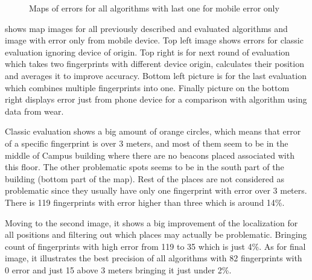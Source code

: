 \begin{figure}[h!]
\begin{centering}
		\par\end{centering}
	\caption{Maps of errors for all algorithms with last one for mobile error only}
	\label{fig09c06}
\end{figure}

 shows map images for all previously described and evaluated algorithms and image with error only from mobile device. Top left image shows errors for classic evaluation ignoring device of origin. Top right is for next round of evaluation which takes two fingerprints with different device origin, calculates their position and averages it to improve accuracy. Bottom left picture is for the last evaluation which combines multiple fingerprints into one. Finally picture on the bottom right displays error just from phone device for a comparison with algorithm using data from wear.  

Classic evaluation shows a big amount of orange circles, which means that error of a specific fingerprint is over 3 meters, and most of them seem to be in the middle of Campus building where there are no beacons placed associated with this floor. The other problematic spots seems to be in the south part of the building (bottom part of the map). Rest of the places are not considered as problematic since they usually have only one fingerprint with error over 3 meters. There is 119 fingerprints with error higher than three which is around 14\%.

Moving to the second image, it shows a big improvement of the localization for all positions and filtering out which places may actually be problematic. Bringing count of fingerprints with high error from 119 to 35 which is just 4\%. As for final image, it illustrates the best precision of all algorithms with 82 fingerprints with 0 error and just 15 above 3 meters bringing it just under 2\%.